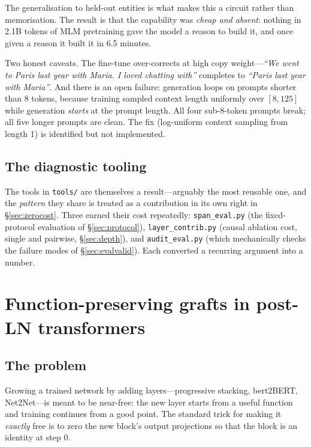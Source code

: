 \documentclass[11pt,a4paper]{article}
\begin{document}
The generalisation to held-out entities is what makes this a circuit rather than memorisation.
The result is that the capability was \emph{cheap and absent}: nothing in 2.1B tokens of MLM
pretraining gave the model a reason to build it, and once given a reason it built it in
6.5 minutes.

Two honest caveats. The fine-tune over-corrects at high copy weight---\emph{``We went to Paris
last year with Maria. I loved chatting with''} completes to \emph{``Paris last year with
Maria''}. And there is an open failure: generation loops on prompts shorter than 8 tokens,
because training sampled context length uniformly over $[8, 125]$ while generation
\emph{starts} at the prompt length. All four sub-8-token prompts break; all five longer prompts
are clean. The fix (log-uniform context sampling from length 1) is identified but not
implemented.

\subsection{The diagnostic tooling}

The tools in \texttt{tools/} are themselves a result---arguably the most reusable one, and
the \emph{pattern} they share is treated as a contribution in its own right in
\S\ref{sec:zerocost}. Three earned their cost repeatedly:
\texttt{span\_eval.py} (the fixed-protocol evaluation of \S\ref{sec:protocol}),
\texttt{layer\_contrib.py} (causal ablation cost, single and pairwise, \S\ref{sec:depth}), and
\texttt{audit\_eval.py} (which mechanically checks the failure modes of
\S\ref{sec:evalvalid}). Each converted a recurring argument into a number.

\section{Function-preserving grafts in post-LN transformers}\label{sec:graft}

\subsection{The problem}

Growing a trained network by adding layers---progressive stacking, bert2BERT, Net2Net---is
meant to be near-free: the new layer starts from a useful function and training continues from
a good point. The standard trick for making it \emph{exactly} free is to zero the new block's
output projections so that the block is an identity at step 0.
\end{document}
